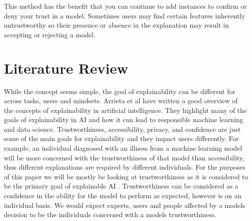 \documentclass[a4paper]{article}
\begin{document}
This method has the benefit that you can continue to add instances to confirm or deny your trust in a model. Sometimes users may find certain features inherently untrustworthy so their presence or absence in the explanation may result in accepting or rejecting a model. 
\section*{Literature Review}

While the concept seems simple, the goal of explainability can be different for across tasks, users and mindsets. Arrieta et al \cite{arrieta2020explainable} have written a good overview of the concepts of explainability in artificial intelligence. They highlight many of the goals of explainability in AI and how it can lead to responsible machine learning and data science. Trustworthiness, accessibility, privacy, and confidence are just some of the main goals for explainability and they impact users differently. For example, an individual diagnosed with an illness from a machine learning model will be more concerned with the trustworthiness of that model than accessibility, thus different explanations are required by different individuals. For the purposes of this paper we will be mostly be looking at trustworthiness as it is considered to be the primary goal of explainable AI \cite{kim2015ibcm}\cite{ribeiro2016should}. Trustworthiness can be considered as a confidence in the ability for the model to perform as expected, however is on an individual basis. We would expect experts, users and people affected by a models decision to be the individuals concerned with a models trustworthiness.\\

\end{document}
